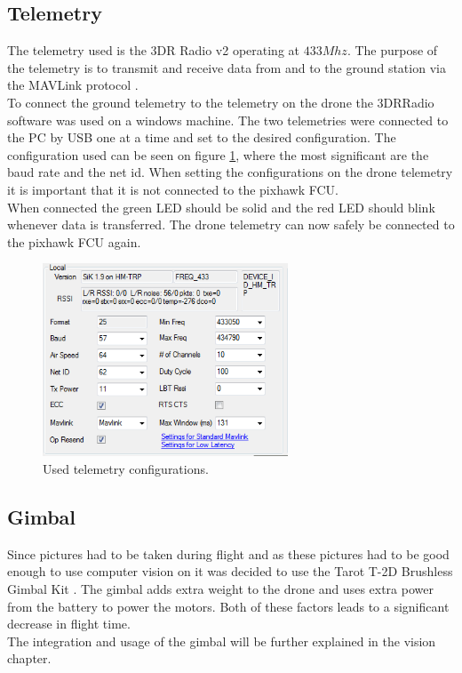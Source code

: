 \subsection*{Telemetry}
The telemetry used is the 3DR Radio v2 \cite{Ref:Telem} operating at $433 Mhz$. The purpose of the telemetry is to transmit and receive data from and to the ground station via the MAVLink protocol \cite{Ref:MAVLink}.\\
To connect the ground telemetry to the telemetry on the drone the 3DRRadio software was used on a windows machine. The two telemetries were connected to the PC by USB one at a time and set to the desired configuration. The configuration used can be seen on figure \ref{fig:telem}, where the most significant are the baud rate and the net id. When setting the configurations on the drone telemetry it is important that it is not connected to the pixhawk FCU.\\
When connected the green LED should be solid and the red LED should blink whenever data is transferred. The drone telemetry can now safely be connected to the pixhawk FCU again.

\begin{figure}[H]
  \centering
    \includegraphics[width=0.65\textwidth]{./Images/telem}
  \caption{Used telemetry configurations.}
  \label{fig:telem}
\end{figure}

\subsection*{Gimbal}
Since pictures had to be taken during flight and as these pictures had to be good enough to use computer vision on it was decided to use the Tarot T-2D Brushless Gimbal Kit \cite{Ref:Gimbal}. The gimbal adds extra weight to the drone and uses extra power from the battery to power the motors. Both of these factors leads to a significant decrease in flight time.\\
The integration and usage of the gimbal will be further explained in the vision chapter. 
